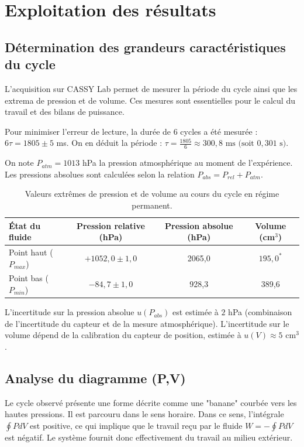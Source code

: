 \documentclass[a4paper,9pt,french]{scrartcl}
\begin{document}
\section{Exploitation des résultats}
\subsection{Détermination des grandeurs caractéristiques du cycle}

L'acquisition sur CASSY Lab permet de mesurer la période du cycle ainsi que les extrema de pression et de volume. Ces mesures sont essentielles pour le calcul du travail et des bilans de puissance.


Pour minimiser l'erreur de lecture, la durée de 6 cycles a été mesurée : $6\tau = 1805 \pm 5$ ms.
On en déduit la période : $\tau = \frac{1805}{6} \approx 300,8 \text{ ms (soit } 0,301 \text{ s)}$.


On note $P_{atm} = 1013$ hPa la pression atmosphérique au moment de l'expérience. Les pressions absolues sont calculées selon la relation $P_{abs} = P_{rel} + P_{atm}$.

\begin{table}[H]
\centering
\begin{tabular}{|l|c|c|c|}
\hline
{État du fluide} & {Pression relative} (hPa) & {Pression absolue} (hPa) & {Volume} (cm$^3$) \\ \hline
Point haut ($P_{max}$) & $+1052,0 \pm 1,0$ & 2065,0 & $195,0^*$ \\ \hline
Point bas ($P_{min}$) & $-84,7 \pm 1,0$ & 928,3 & 389,6 \\ \hline
\end{tabular}
\caption{Valeurs extrêmes de pression et de volume au cours du cycle en régime permanent.}
\end{table}
L'incertitude sur la pression absolue $u(P_{abs})$ est estimée à $2$ hPa (combinaison de l'incertitude du capteur et de la mesure atmosphérique). L'incertitude sur le volume dépend de la calibration du capteur de position, estimée à $u(V) \approx 5$ cm$^3$.
\subsection{Analyse du diagramme (P,V)}

Le cycle observé présente une forme décrite comme une "banane" courbée vers les hautes pressions. 
Il est parcouru dans le {sens horaire}. Dans ce sens, l'intégrale $\oint P dV$ est positive, ce qui implique que le travail reçu par le fluide $W = -\oint P dV$ est négatif. 
Le système fournit donc effectivement du travail au milieu extérieur.
\end{document}
